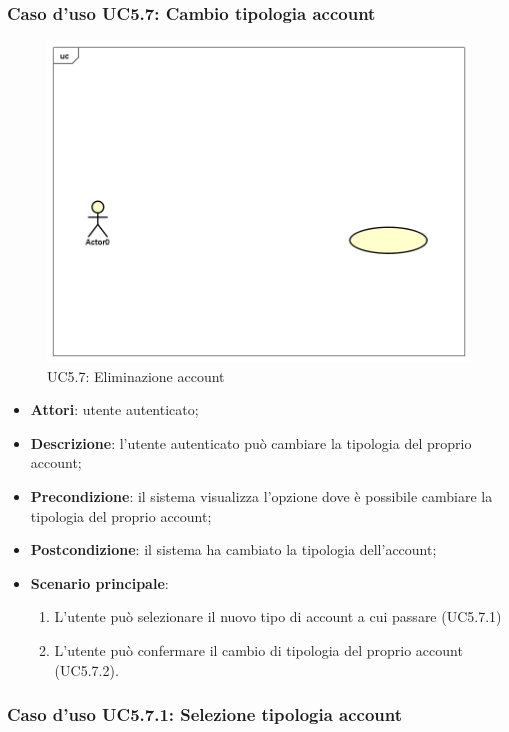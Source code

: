 \subsubsection{Caso d'uso UC5.7: Cambio tipologia account}
\label{UC5.7}
\begin{figure}[h]
	\centering
	\includegraphics[scale=0.5,keepaspectratio]{UML/UC5_7.png}
	\caption{UC5.7: Eliminazione account}
\end{figure}

\begin{itemize}
	\item \textbf{Attori}: utente autenticato;
	\item \textbf{Descrizione}: l'utente autenticato può cambiare la tipologia del proprio account; 
	\item \textbf{Precondizione}: il sistema visualizza l'opzione dove è possibile cambiare la tipologia del proprio account;
	\item \textbf{Postcondizione}: il sistema ha cambiato la tipologia dell'account;
	\item \textbf{Scenario principale}:
	\begin{enumerate}
		\item L'utente può selezionare il nuovo tipo di account a cui passare (UC5.7.1)
		\item L'utente può confermare il cambio di tipologia del proprio account (UC5.7.2).
	\end{enumerate}
\end{itemize}

\subsubsection{Caso d'uso UC5.7.1: Selezione tipologia account}

